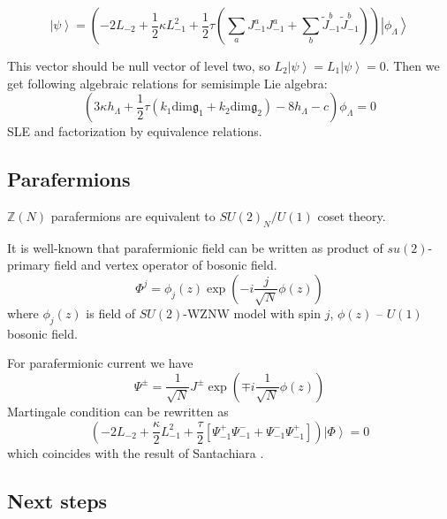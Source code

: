 \documentclass[a4paper]{jpconf}
\theoremstyle{definition}
\newcommand{\gf}{\mathfrak{g}}
\theoremstyle{definition} \newtheorem{Def}{Definition}
\begin{document}
\begin{equation*}
  \left| \psi\right>=\left(-2 L_{-2}+\frac{1}{2}\kappa L_{-1}^{2}+\frac{1}{2}\tau\left(\sum_{a} J^{a}_{-1} J^{a}_{-1}+\sum_{b}\tilde{J}^{b}_{-1}\tilde{J}^{b}_{-1}\right) \right) \left|\phi_{\Lambda}\right>    
\end{equation*}

This vector should be null vector of level two, so $L_{2}\left|\psi\right>=L_{1}\left|\psi\right>=0$. Then we get following algebraic relations for semisimple Lie algebra:
\begin{equation}
  \label{eq:7}
  \left( 3\kappa h_{\Lambda} +\frac{1}{2} \tau (k_{1} \mathrm{dim} \gf_{1}+k_{2}\mathrm{dim} \gf_{2}) -8 h_{\Lambda} - c\right)\phi_{\Lambda}=0
\end{equation}
SLE and factorization by equivalence relations. 

\subsection{Parafermions}
\label{sec:parafermions}

$\mathbb{Z}(N)$ parafermions are equivalent to $SU(2)_{N}/U(1)$ coset theory.

It is well-known that parafermionic field can be written as product of $su(2)$-primary field and vertex operator of bosonic field. 
\begin{equation*}
  \Phi^{j}=\phi_{j}(z) \exp\left( -i \frac{j}{\sqrt{N}}\phi(z)\right)
\end{equation*}
where $\phi_{j}(z)$ is field of $SU(2)$-WZNW model with spin $j$, $\phi(z)$ -- $U(1)$ bosonic field.

For parafermionic current we have
\begin{equation*}
  \Psi^{\pm}=\frac{1}{\sqrt{N}} J^{\pm}\exp\left(\mp i \frac{1}{\sqrt{N}}\phi(z)\right)
\end{equation*}
Martingale condition can be rewritten as
\begin{equation*}
  \left(-2 L_{-2}+\frac{\kappa}{2}L_{-1}^{2}+\frac{\tau}{2}\left[\Psi^{+}_{-1}\Psi^{-}_{-1}+\Psi^{-}_{-1}\Psi^{+}_{-1}\right]\right) \left|\Phi\right>=0
\end{equation*}
which coincides with the result of Santachiara \cite{santachiara2008sle}.



\subsection{Next steps}
\end{document}
